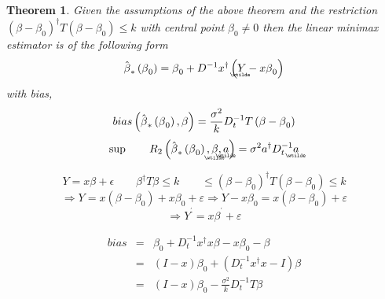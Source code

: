 \documentclass{article}
\newtheorem{theorem}{Theorem}
\begin{document}
\begin{theorem}
Given the assumptions of the above theorem and the restriction $\left( \beta
-\beta _{0}\right) ^{\dagger }T\left( \beta -\beta _{0}\right) \leq k$ with
central point $\beta _{0}\neq 0$ then the linear minimax estimator is of the
following form%
\begin{equation*}
\hat{\beta}_{\ast }\left( \beta _{0}\right) =\beta _{0}+D^{-1}x^{\dagger
}\left( 
\underaccent{\wtilde}{Y}%
-x\beta _{0}\right)
\end{equation*}%
with bias,%
\begin{equation*}
bias\left( \hat{\beta}_{\ast }\left( \beta _{0}\right) ,\beta \right) =\frac{%
\sigma ^{2}}{k}D_{t}^{-1}T\left( \beta -\beta _{0}\right)
\end{equation*}%
\begin{equation*}
\sup \qquad R_{2}\left( \hat{\beta}_{\ast }\left( \beta _{0}\right) ,%
\underaccent{\wtilde}{\beta}%
,%
\underaccent{\wtilde}{a}%
\right) =\sigma ^{2}a^{\dagger }D_{t}^{-1}%
\underaccent{\wtilde}{a}%
\end{equation*}
\end{theorem}

\bigskip

\begin{equation*}
Y=x\beta +\epsilon \qquad \beta ^{\dagger }T\beta \leq k\qquad \leq \left(
\beta -\beta _{0}\right) ^{\dagger }T\left( \beta -\beta _{0}\right) \leq k
\end{equation*}%
\begin{equation*}
\Rightarrow Y=x\left( \beta -\beta _{0}\right) +x\beta _{0}+\varepsilon
\Rightarrow Y-x\beta _{0}=x\left( \beta -\beta _{0}\right) +\varepsilon
\end{equation*}%
\begin{equation*}
\Rightarrow Y^{^{\prime }}=x\beta ^{^{\prime }}+\varepsilon
\end{equation*}

\bigskip

\begin{eqnarray*}
bias &=&\beta _{0}+D_{t}^{-1}x^{\dagger }x\beta -x\beta _{0}-\beta \\
&=&\left( I-x\right) \beta _{0}+\left( D_{t}^{-1}x^{\dagger }x-I\right) \beta
\\
&=&\left( I-x\right) \beta _{0}-\frac{\sigma ^{2}}{k}D_{t}^{-1}T\beta
\end{eqnarray*}
\end{document}
